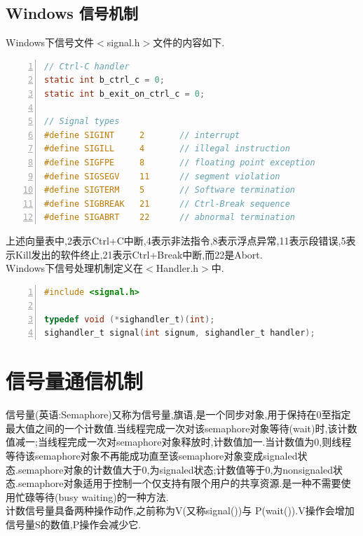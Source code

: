 \documentclass[a4paper,12pt,notitlepage]{article}
\begin{document}
\subsection{Windows 信号机制}

	Windows下信号文件$<$signal.h$>$文件的内容如下. \\
	
\begin{lstlisting}[frame=shadowbox,numbers=left,language=C]
// Ctrl-C handler
static int b_ctrl_c = 0;
static int b_exit_on_ctrl_c = 0;

// Signal types
#define SIGINT     2       // interrupt
#define SIGILL     4       // illegal instruction
#define SIGFPE     8       // floating point exception
#define SIGSEGV    11      // segment violation
#define SIGTERM    5       // Software termination
#define SIGBREAK   21      // Ctrl-Break sequence
#define SIGABRT    22      // abnormal termination
\end{lstlisting}
	
	上述向量表中,2表示Ctrl+C中断,4表示非法指令,8表示浮点异常,11表示段错误,5表示Kill发出的软件终止,21表示Ctrl+Break中断,而22是Abort. \\	
	
	Windows下信号处理机制定义在$<$Handler.h$>$中. \\
	
\begin{lstlisting}[frame=shadowbox,numbers=left,language=C]
#include <signal.h>

typedef void (*sighandler_t)(int);
sighandler_t signal(int signum, sighandler_t handler);
\end{lstlisting}
	
\section{信号量通信机制}

	信号量(英语:Semaphore)又称为信号量,旗语,是一个同步对象,用于保持在0至指定最大值之间的一个计数值.当线程完成一次对该semaphore对象等待(wait)时,该计数值减一;当线程完成一次对semaphore对象释放时,计数值加一.当计数值为0,则线程等待该semaphore对象不再能成功直至该semaphore对象变成signaled状态.semaphore对象的计数值大于0,为signaled状态;计数值等于0,为nonsignaled状态.semaphore对象适用于控制一个仅支持有限个用户的共享资源.是一种不需要使用忙碌等待(busy waiting)的一种方法.\\
	
	计数信号量具备两种操作动作,之前称为V(又称signal())与 P(wait()).V操作会增加信号量S的数值,P操作会减少它. \\
	
\end{document}
